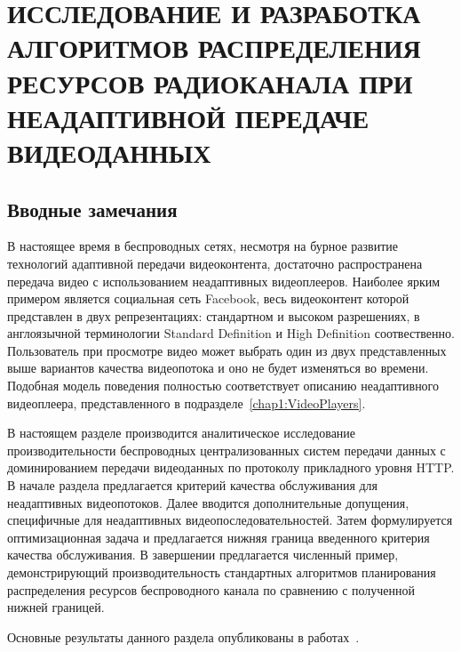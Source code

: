 \chapter{ИССЛЕДОВАНИЕ И РАЗРАБОТКА АЛГОРИТМОВ РАСПРЕДЕЛЕНИЯ РЕСУРСОВ РАДИОКАНАЛА ПРИ НЕАДАПТИВНОЙ ПЕРЕДАЧЕ ВИДЕОДАННЫХ}
\label{chap3}

\section{Вводные замечания}
\label{chap3:Intro}
В настоящее время в беспроводных сетях, несмотря на бурное развитие технологий адаптивной передачи видеоконтента, достаточно распространена передача видео с использованием неадаптивных видеоплееров. Наиболее ярким примером является социальная сеть Facebook, весь видеоконтент которой представлен в двух репрезентациях: стандартном и высоком разрешениях, в англоязычной терминологии Standard Definition и High Definition соотвественно. Пользователь при просмотре видео может выбрать один из двух представленных выше вариантов качества видеопотока и оно не будет изменяться во времени. Подобная модель поведения полностью соответствует описанию неадаптивного видеоплеера, представленного в подразделе~\ref{chap1:VideoPlayers}.

В настоящем разделе производится аналитическое исследование производительности беспроводных централизованных систем передачи данных с доминированием передачи видеоданных по протоколу прикладного уровня HTTP. В начале раздела предлагается критерий качества обслуживания для неадаптивных видеопотоков. Далее вводится дополнительные допущения, специфичные для неадаптивных видеопоследовательностей. Затем формулируется оптимизационная задача и предлагается нижняя граница введенного критерия качества обслуживания. В завершении предлагается численный пример, демонстрирующий производительность стандартных алгоритмов планирования распределения ресурсов беспроводного канала по сравнению с полученной нижней границей.

Основные результаты данного раздела опубликованы в работах~\cite{past_tur,Suai2017}.

